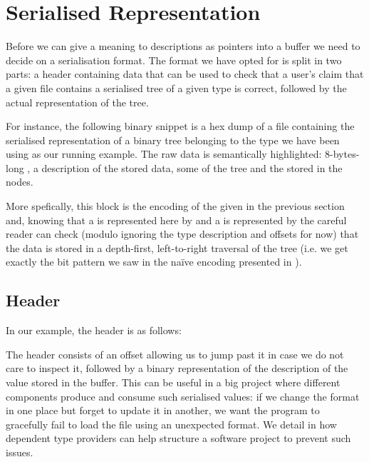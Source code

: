 \section{Serialised Representation}\label{sec:hexdump}

Before we can give a meaning to descriptions as pointers into a buffer we
need to decide on a serialisation format.
%
The format we have opted for is split in two parts: a header containing
data that can be used to check that a user's claim that a given file
contains a serialised tree of a given type is correct, followed by the
actual representation of the tree.


For instance, the following binary snippet is a hex dump of a file
containing the serialised representation of a binary tree belonging to
the type we have been using as our running example.
%
The raw data is semantically highlighted:
8-bytes-long ,
a  description of the stored data,
some  of the tree
and the  stored in the nodes.

\begin{center}

\end{center}

More spefically, this block is the encoding of the 
given in the previous section and,
%
knowing that a  is represented here by 
and a  is represented by 
%
the careful reader can check
(modulo ignoring the type description and offsets for now)
that the data is stored in a depth-first, left-to-right traversal of the tree
(i.e. we get exactly the bit pattern we saw in the naïve encoding
presented in ).


\subsection{Header}

In our example, the header is as follows:
\begin{hexdump}
 
\end{hexdump}

The header consists of an offset allowing us to jump past it in case we do
not care to inspect it, followed by a binary representation of the
 description of the value stored in the buffer.
%
This can be useful in a big project where different components produce
and consume such serialised values: if we change the format in one place
but forget to update it in another, we want the program to gracefully
fail to load the file using an unexpected format.
%
We detail in  how dependent type providers
can help structure a software project to prevent such issues.

